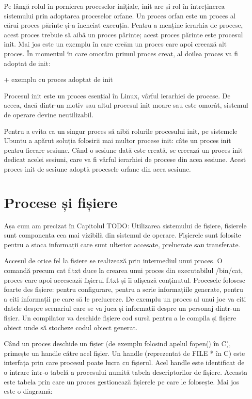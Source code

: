 Pe lângă rolul în pornierea proceselor inițiale, init are și rol în întreținerea
sistemului prin adoptarea proceselor orfane. Un proces orfan este un proces al
cărui proces părinte și-a încheiat execuția. Pentru a menține ierarhia de
procese, acest proces trebuie să aibă un proces părinte; acest proces părinte
este procesul init. Mai jos este un exemplu în care creăm un proces care apoi
creează alt proces. În momentul în care omorâm primul proces creat, al doilea
proces va fi adoptat de init:

+ exemplu cu proces adoptat de init

Procesul init este un proces esențial în Linux, vârful ierarhiei de procese. De
aceea, dacă dintr-un motiv sau altul procesul init moare sau este omorât,
sistemul de operare devine neutilizabil.

Pentru a evita ca un singur proces să aibă rolurile procesului init, pe
sistemele Ubuntu a apărut soluția folosirii mai multor procese init: câte un
proces init pentru fiecare sesiune. Când o sesiune dată este creată, se creează
un proces init dedicat acelei sesiuni, care va fi vârful ierarhiei de procese
din acea sesiune. Acest proces init de sesiune adoptă procesele orfane din acea
sesiune.

\section{Procese și fișiere}

Așa cum am precizat în Capitolul TODO: Utilizarea sistemului de fișiere,
fișierele sunt componenta cea mai vizibilă din sistemul de operare. Fișierele
sunt folosite pentru a stoca informații care sunt ulterior accesate, prelucrate
sau transferate.

Accesul de orice fel la fișiere se realizează prin intermediul unui proces. O
comandă precum cat f.txt duce la crearea unui proces din executabilul /bin/cat,
proces care apoi accesează fișierul f.txt și îi afișează conținutul. Procesele
folosesc foarte des fișiere: pentru configurare, pentru a scrie informațiile
generate, pentru a citi informații pe care să le prelucreze. De exemplu un
proces al unui joc va citi datele despre scenariul care se va juca și informații
despre un personaj dintr-un fișier. Un compilator va deschide fișiere cod sursă
pentru a le compila și fișiere obiect unde să stocheze codul obiect generat.

Când un proces deschide un fișier (de exemplu folosind apelul fopen() în C),
primește un handle către acel fișier. Un handle (reprezentat de FILE * în C)
este interfața prin care procesul poate lucra cu fișierul. Acel handle este
identificat de o intrare într-o tabelă a procesului numită tabela descriptorilor
de fișiere. Aceasta este tabela prin care un proces gestionează fișierele pe
care le folosește. Mai jos este o diagramă:

